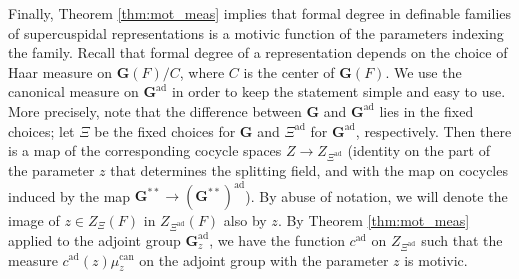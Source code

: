\documentclass{amsart}
\newcommand{\bG}{\mathbf{G}}
\newcommand{\can}{\mathrm{can}}
\newcommand\ad{\mathrm{ad}}
\theoremstyle{plain}
\theoremstyle{definition}
\begin{document}
Finally, Theorem \ref{thm:mot_meas} implies that formal degree in definable families of
supercuspidal representations is a motivic function of the parameters indexing the family. 
Recall that formal degree of a representation depends on the choice of Haar measure on 
$\bG(F)/C$, where $C$ is the center of $\bG(F)$. 
We use the canonical measure on $\bG^\ad$ in order to keep the statement simple and easy to use. 
More precisely, note that the difference between $\bG$ and $\bG^\ad$ lies in the fixed choices; let $\Xi$ be the fixed choices for 
$\bG$ and  $\Xi^\ad$ for $\bG^{\ad}$,  respectively. 
Then there is a map of the corresponding cocycle spaces $Z\to Z_{\Xi^\ad}$ (identity on the part of the parameter $z$ that determines the splitting field, and with the map on  cocycles induced by
the map $\bG^{\ast\ast} \to (\bG^{\ast\ast})^{\ad}$). By abuse of notation, we will denote the image of $z\in Z_\Xi(F)$ in 
$Z_{\Xi^\ad}(F)$ also by $z$.  
By Theorem \ref{thm:mot_meas} applied to the adjoint group $\bG_z^{\ad}$, we have the function $c^\ad$ on $Z_{\Xi^\ad}$ such that the measure 
$c^\ad(z) \mu_z^{\can}$ on the adjoint group with the parameter $z$ is motivic. 
 
\end{document}
